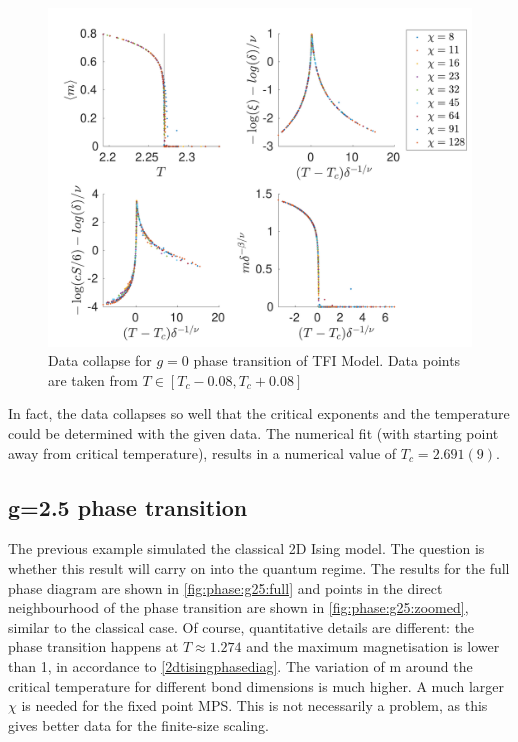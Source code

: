 \begin{figure}[h!]
    \center
    \includegraphics[width=\textwidth]{Figuren/phasediag/g0/zoomed.pdf}
    \caption{ Data collapse for $g=0$ phase transition of \Gls{TFI} Model. Data points are taken from $T \in \left[ T_c -0.08, T_c +0.08 \right]$ }
    \label{fig:phase:g0:zoomed}
\end{figure}
In fact, the data collapses so well that the critical exponents and the temperature could be determined with the given data. The numerical fit (with starting point away from  critical temperature), results in a numerical value of $T_c = 2.691(9) $.

\subsection{g=2.5 phase transition}

The previous example simulated the classical 2D Ising model. The question is whether this result will carry on into the quantum regime. The results for the full phase diagram are shown in \cref{fig:phase:g25:full} and points in the direct neighbourhood of the phase transition are shown in \cref{fig:phase:g25:zoomed}, similar to the classical case. Of course, quantitative details are different: the phase transition happens at $T\approx 1.274$ and the maximum magnetisation is lower than 1, in accordance to \cref{2dtisingphasediag}. The variation of m around the critical temperature for different bond dimensions is much higher. A much larger $\chi$ is needed for the fixed point \Gls{MPS}. This is not necessarily a problem, as this gives better data for the finite-size scaling.

